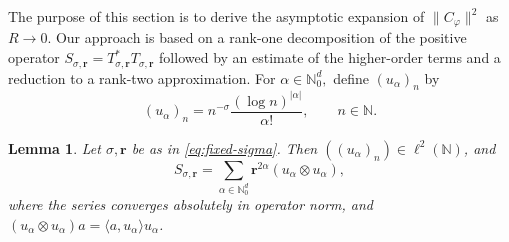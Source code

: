 \documentclass[12pt, reqno]{amsart}
\numberwithin{equation}{section}
\newtheorem{lemma}[theorem]{Lemma}
\begin{document}
The purpose of this section is to derive the asymptotic expansion of $\|C_{\varphi}\|^2$ as $R\to 0$. Our approach is based on a rank-one decomposition of the positive operator
$S_{\sigma,\boldsymbol{r}}=T_{\sigma,\boldsymbol{r}}^{*}T_{\sigma,\boldsymbol{r}}$
followed by an estimate of the higher-order terms and a reduction to a rank-two approximation. For $\alpha\in\mathbb{N}_{0}^{d},$ define $(u_{\alpha})_n$ by
\[
(u_{\alpha})_n
=
n^{-\sigma}
\frac{(\log n)^{|\alpha|}}{\alpha!},
\qquad
n\in\mathbb{N}.
\]


\begin{lemma}
\label{lem:finite-prime-input-rank-one-expansion}
Let $\sigma, \boldsymbol{r}$ be as in \eqref{eq:fixed-sigma}. Then $((u_{\alpha})_n)\in\ell^{2}(\mathbb{N})$, and
\[
S_{\sigma,\boldsymbol{r}}
=
\sum_{\alpha\in\mathbb{N}_{0}^{d}}
\boldsymbol{r}^{2\alpha}(u_{\alpha}\otimes u_{\alpha}),
\]
where the series converges absolutely in operator norm, and  $(u_{\alpha} \otimes u_{\alpha} )a = \langle a, u_{\alpha} \rangle u_{\alpha}$.
\end{lemma}
\end{document}
